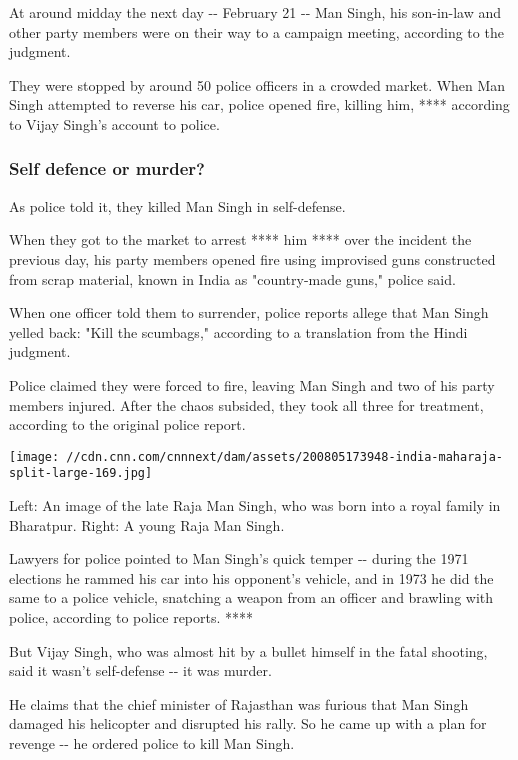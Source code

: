 At around midday the next day -\/- February 21 -\/- Man Singh, his
son-in-law and other party members were on their way to a campaign
meeting, according to the judgment.

They were stopped by around 50 police officers in a crowded market. When
Man Singh attempted to reverse his car, police opened fire, killing him,
**** according to Vijay Singh's account to police.

\hypertarget{self-defence-or-murder}{%
\subsubsection{Self defence or murder?}\label{self-defence-or-murder}}

As police told it, they killed Man Singh in self-defense.

When they got to the market to arrest **** him **** over the incident
the previous day, his party members opened fire using improvised guns
constructed from scrap material, known in India as "country-made guns,"
police said.

When one officer told them to surrender, police reports allege that Man
Singh yelled back: "Kill the scumbags," according to a translation from
the Hindi judgment.

Police claimed they were forced to fire, leaving Man Singh and two of
his party members injured. After the chaos subsided, they took all three
for treatment, according to the original police report.

\texttt{[image: //cdn.cnn.com/cnnnext/dam/assets/200805173948-india-maharaja-split-large-169.jpg]}

Left: An image of the late Raja Man Singh, who was born into a royal
family in Bharatpur. Right: A young Raja Man Singh.

Lawyers for police pointed to Man Singh's quick temper -\/- during the
1971 elections he rammed his car into his opponent's vehicle, and in
1973 he did the same to a police vehicle, snatching a weapon from an
officer and brawling with police, according to police reports. ****

But Vijay Singh, who was almost hit by a bullet himself in the fatal
shooting, said it wasn't self-defense -\/- it was murder.

He claims that the chief minister of Rajasthan was furious that Man
Singh damaged his helicopter and disrupted his rally. So he came up with
a plan for revenge -\/- he ordered police to kill Man Singh.

